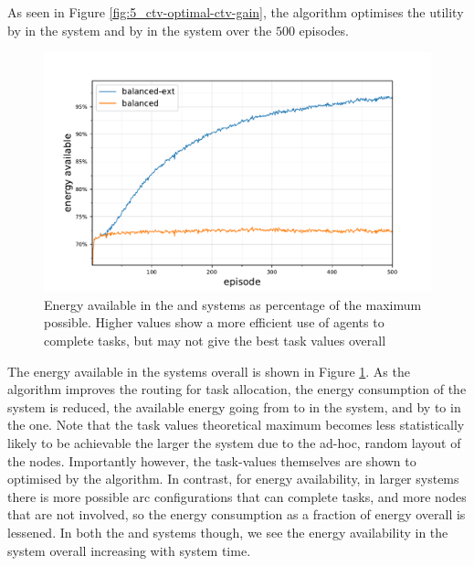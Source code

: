 As seen in Figure \ref{fig:5_ctv-optimal-ctv-gain}, the \algorithmBalanced{}{} algorithm optimises the utility by \resultsCTVBalancedDiff{}{}  in the \simulationSimple{}{} system and by \resultsCTVBalancedExtDiff{}{} in the \simulationExtended{}{} system over the $500$ episodes.
\begin{figure}[ht]
	\centering
	\includegraphics[width=0.7\linewidth]{5balanced_ctv-statistics-energy-available}
	\captionsetup{labelfont=bf,singlelinecheck=on}
	\caption{Energy available in the \simulationSimple{}{} and \simulationExtended{}{} systems as percentage of the maximum possible. Higher values show a more efficient use of agents to complete tasks, but may not give the best task values overall}
	\label{fig:ctv-statistics-energy-available}
\end{figure}
The energy available in the systems overall is shown in Figure \ref{fig:ctv-statistics-energy-available}. As the algorithm improves the routing for task allocation, the energy consumption of the system is reduced, the available energy going from \resultsEnergyBalancedStart{}{} to \resultsEnergyBalancedEnd{}{} in the \simulationSimple{}{} system, and by \resultsEnergyBalancedExtStart{}{} to \resultsEnergyBalancedExtEnd{}{} in the \simulationExtended{}{} one. Note that the task values theoretical maximum becomes less statistically likely to be achievable the larger the system due to the ad-hoc, random layout of the nodes. Importantly however, the task-values themselves are shown to optimised by the algorithm. In contrast, for energy availability, in larger systems there is more possible arc configurations that can complete tasks, and more nodes that are not involved, so the  energy consumption as a fraction of energy overall is lessened. In both the \simulationSimple{}{} and \simulationExtended{}{} systems though, we see the energy availability in the system overall increasing with system time.

